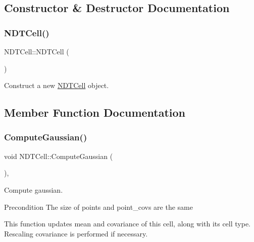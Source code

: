 \subsection{Constructor \& Destructor Documentation}
\mbox{\label{classNDTCell_acfc90537523f63170f002f74d7db1bd5}} 
\subsubsection{\texorpdfstring{N\+D\+T\+Cell()}{NDTCell()}}
{\footnotesize\ttfamily N\+D\+T\+Cell\+::\+N\+D\+T\+Cell (\begin{DoxyParamCaption}{ }\end{DoxyParamCaption})}



Construct a new \hyperlink{classNDTCell}{N\+D\+T\+Cell} object. 



\subsection{Member Function Documentation}
\mbox{\label{classNDTCell_a45a92594eb74881f3684c84c4bdfa91e}} 
\subsubsection{\texorpdfstring{Compute\+Gaussian()}{ComputeGaussian()}}
{\footnotesize\ttfamily void N\+D\+T\+Cell\+::\+Compute\+Gaussian (\begin{DoxyParamCaption}{ }\end{DoxyParamCaption})\hspace{0.3cm}{\ttfamily [override]}, {\ttfamily [virtual]}}



Compute gaussian. 

\begin{DoxyPrecond}{Precondition}
The size of {\ttfamily points} and {\ttfamily point\+\_\+covs} are the same
\end{DoxyPrecond}
This function updates mean and covariance of this cell, along with its cell type. Rescaling covariance is performed if necessary. 

